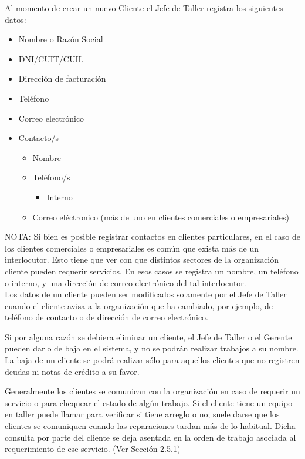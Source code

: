 \documentclass[12pt]{extarticle}
\begin{document}
\begin{spacing}{1.2}
    Al momento de crear un nuevo Cliente el Jefe de Taller registra los siguientes datos:
    \begin{itemize}
        \item Nombre o Razón Social
        \item DNI/CUIT/CUIL
        \item Dirección de facturación
        \item Teléfono
        \item Correo electrónico
        \item Contacto/s
        	\begin{itemize}
				\item Nombre	
		        \item Teléfono/s
		        \begin{itemize}
			        \item Interno	        
		        \end{itemize}
		        \item Correo eléctronico (más de uno en clientes comerciales o empresariales)\\        	
        	\end{itemize}
    \end{itemize}

        NOTA: Si bien es posible registrar contactos en clientes particulares, en el caso de los clientes comerciales o empresariales es común que exista más de un interlocutor. Esto tiene que ver con que distintos sectores de la organización cliente pueden requerir servicios. En esos casos se registra un nombre, un teléfono o interno, y una dirección de correo electrónico del tal interlocutor. \\

    Los datos de un cliente pueden ser modificados solamente por el Jefe de Taller cuando el cliente avisa a la organización que ha cambiado, por ejemplo, de teléfono de contacto o de dirección de correo electrónico.

    Si por alguna razón se debiera eliminar un cliente, el Jefe de Taller o el Gerente pueden darlo de baja en el sistema, y no se podrán realizar trabajos a su nombre. La baja de un cliente se podrá realizar sólo para aquellos clientes que no registren deudas ni notas de crédito a su favor.
    
    Generalmente los clientes se comunican con la organización en caso de requerir un servicio o para chequear el estado de algún trabajo. Si el cliente tiene un equipo en taller puede llamar para verificar si tiene arreglo o no; suele darse que los clientes se comuniquen cuando las reparaciones tardan más de lo habitual. Dicha consulta por parte del cliente se deja asentada en la orden de trabajo asociada al requerimiento de ese servicio. (Ver Sección 2.5.1)\\

\end{spacing}
\end{document}
